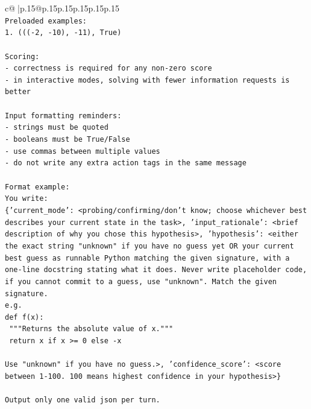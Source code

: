 \documentclass{article}
\begin{document}
{\begin{supertabular}{c@{$\;$}|p{.15\linewidth}@{}p{.15\linewidth}p{.15\linewidth}p{.15\linewidth}p{.15\linewidth}p{.15\linewidth}}
{{{\\ 
\texttt{Preloaded examples:} \\
\texttt{1. ((({-}2, {-}10), {-}11), True)} \\
\\ 
\texttt{Scoring:} \\
\texttt{{-} correctness is required for any non{-}zero score} \\
\texttt{{-} in interactive modes, solving with fewer information requests is better} \\
\\ 
\texttt{Input formatting reminders:} \\
\texttt{{-} strings must be quoted} \\
\texttt{{-} booleans must be True/False} \\
\texttt{{-} use commas between multiple values} \\
\texttt{{-} do not write any extra action tags in the same message} \\
\\ 
\texttt{Format example:} \\
\texttt{You write:} \\
\texttt{\{'current\_mode': <probing/confirming/don't know; choose whichever best describes your current state in the task>, 'input\_rationale': <brief description of why you chose this hypothesis>, 'hypothesis': <either the exact string "unknown" if you have no guess yet OR your current best guess as runnable Python matching the given signature, with a one{-}line docstring stating what it does. Never write placeholder code, if you cannot commit to a guess, use "unknown". Match the given signature.} \\
\texttt{e.g.} \\
\texttt{def f(x):} \\
\texttt{	"""Returns the absolute value of x."""} \\
\texttt{	return x if x >= 0 else {-}x} \\
\\ 
\texttt{Use "unknown" if you have no guess.>, 'confidence\_score': <score between 1{-}100. 100 means highest confidence in your hypothesis>\}} \\
\\ 
\texttt{Output only one valid json per turn.} \\
            }
        }
    }
     \\ \\


\end{supertabular}}
\end{document}
